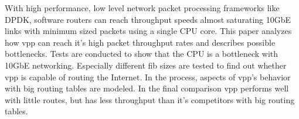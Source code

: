 \small

With high performance, low level network packet processing frameworks
like DPDK, software routers can reach throughput speeds almost
saturating 10GbE links with minimum sized packets using a single CPU
core. This paper analyzes how \Ac{vpp} can reach it's high packet
throughput rates and describes possible bottlenecks. Tests are
conducted to show that the CPU is a bottleneck with 10GbE networking.
Especially different \Ac{fib} sizes are tested to find out whether
\Ac{vpp} is capable of routing the Internet. In the process, aspects
of \Ac{vpp}'s behavior with big routing tables are modeled. In the
final comparison \Ac{vpp} performs well with little routes, but has
less throughput than it's competitors with big routing tables.


